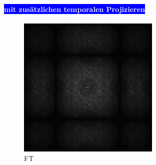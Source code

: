 \begin{figure}[H]
\begin{tcolorbox}[boxrule=4pt,sharp corners=downhill,title=Szene unter Kamerabewegung, fonttitle=\bfseries]
\begin{subfigure}[b]{0.2\linewidth}
         \caption{}
         \label{pic:NoTemporalRepr_4}
    \end{subfigure}
    \tcblower
    \paragraph{\hfill\colorbox{blue}{\textcolor{white}{mit zusätzlichen temporalen Projizieren}}}
    \centering
    \begin{subfigure}[b]{0.2\linewidth}
      \includegraphics[width=\linewidth]{content/TemporalerAlg/Bilder/Reprojection/TemporalRepr/Ausschnitte/Ausschnitt1_FFT.png}
       \caption{FT}
       \label{pic:TemporalRepr_1_FFT}
    \end{subfigure}
    \begin{subfigure}[b]{0.2\linewidth}

\end{subfigure}
\end{tcolorbox}
\end{figure}
